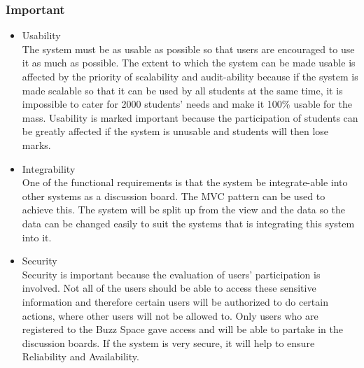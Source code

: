 	\subsubsection{Important}
		\begin{itemize}
			\item Usability \\
			The system must be as usable as possible so that users are encouraged to use it as much as possible. The extent to which the system can be made usable is affected by the priority of scalability and audit-ability because if the system is made scalable so that it can be used by all students at the same time, it is impossible to cater for 2000 students' needs and make it 100\% usable for the mass. Usability is marked important because the participation of students can be greatly affected if the system is unusable and students will then lose marks.

			\item Integrability\\
			One of the functional requirements is that the system be integrate-able into other systems as a discussion board. The MVC pattern can be used to achieve this. The system will be split up from the view and the data so the data can be changed easily to suit the systems that is integrating this system into it.
			
			\item Security\\
Security is important because the evaluation of users' participation is involved. Not all of the users should be able to access these sensitive information and therefore certain users will be authorized to do certain actions,
where other users will not be allowed to. Only users who are registered to the Buzz Space gave access and will be able to partake in the discussion boards.
If the system is very secure, it will help to ensure Reliability and Availability.
		\end{itemize}
